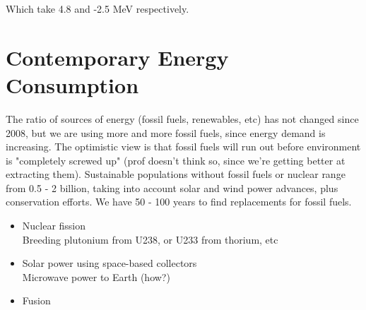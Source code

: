 \documentclass[12pt]{article}
\begin{document}
Which take 4.8 and -2.5 MeV respectively.

\section{Contemporary Energy Consumption}

The ratio of sources of energy (fossil fuels, renewables, etc) has not changed since 2008, but we are using more and more fossil fuels, since energy demand is increasing. The optimistic view is that fossil fuels will run out before environment is "completely screwed up" (prof doesn't think so, since we're getting better at extracting them). Sustainable populations without fossil fuels or nuclear range from 0.5 - 2 billion, taking into account solar and wind power advances, plus conservation efforts. We have 50 - 100 years to find replacements for fossil fuels.

\begin{itemize}
    \item Nuclear fission \\
        Breeding plutonium from U238, or U233 from thorium, etc
    \item Solar power using space-based collectors \\
        Microwave power to Earth (how?)
    \item Fusion
\end{itemize}
\end{document}
